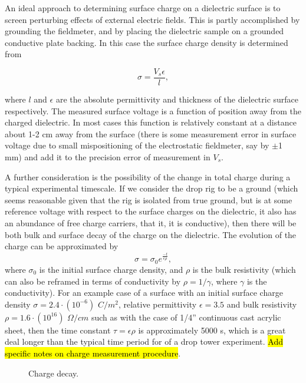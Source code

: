 \documentclass[10pt,a4paper]{article}
\begin{document}
An ideal approach to determining surface charge on a dielectric surface is to screen perturbing effects of external electric fields. This is partly accomplished by grounding the fieldmeter, and by placing the dielectric sample on a grounded conductive plate backing. In this case the surface charge density is determined from

\[ \sigma = \frac{V_s \epsilon}{l}, \]

where $l$ and $\epsilon$ are the absolute permittivity and thickness of the dielectric surface respectively. The measured surface voltage is a function of position away from the charged dielectric. In most cases this function is relatively constant at a distance about 1-2 cm away from the surface (there is some measurement error in surface voltage due to small mispositioning of the electrostatic fieldmeter, say by $\pm$1 mm) and add it to the precision error of measurement in $V_s$. 

A further consideration is the possibility of the change in total charge during a typical experimental timescale. If we consider the drop rig to be a ground (which seems reasonable given that the rig is isolated from true ground, but is at some reference voltage with respect to the surface charges on the dielectric, it also has an abundance of free charge carriers, that it, it is conductive), then there will be both bulk and surface decay of the charge on the dielectric. The evolution of the charge can be approximated by
\[ \sigma = \sigma_0 e^{\frac{-t}{\epsilon \rho}}, \]
where $\sigma_0$ is the initial surface charge density, and $\rho$ is the bulk resistivity (which can also be reframed in terms of conductivity by $\rho = 1/\gamma$, where $\gamma$ is the conductivity). For an example case of a surface with an initial surface charge density $\sigma = 2.4 \cdot (10^{-6})$ $C/m^2$, relative permittivity $\epsilon = 3.5$ and bulk resistivity $\rho = 1.6 \cdot (10^{16})$ $\Omega/cm$ such as with the case of 1/4'' continuous cast acrylic sheet, then the time constant $\tau = \epsilon \rho$ is approximately 5000 s, which is a great deal longer than the typical time period for of a drop tower experiment. \hl{Add specific notes on charge measurement procedure}.

\begin{figure}
    \centering
    
       \caption{Charge decay.\label{fig:charge_decay}}
\end{figure}

\newpage
\end{document}
